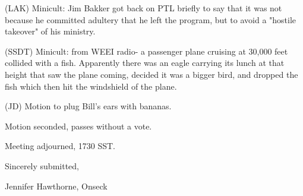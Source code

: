 \documentclass[12pt]{article}
\begin{document}
(LAK) Minicult: Jim Bakker got back on PTL briefly to say that it was not because he committed adultery that he left the program, but to avoid a "hostile takeover" of his ministry.

(SSDT) Minicult: from WEEI radio- a passenger plane cruising at 30,000 feet collided with a fish. Apparently there was an eagle carrying its lunch at that height that saw the plane coming, decided it was a bigger bird, and dropped the fish which then hit the windshield of the plane.

(JD) Motion to plug Bill's ears with bananas.

Motion seconded, passes without a vote.

\vspace{12pt}

\noindent
Meeting adjourned, 1730 SST.

\vspace{18pt}

\centerline{Sincerely submitted,}
\centerline{Jennifer Hawthorne, Onseck}
\end{document}
